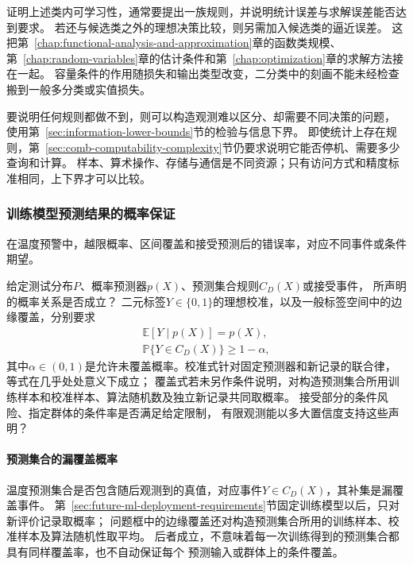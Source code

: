 证明上述类内可学习性，通常要提出一族规则，并说明统计误差与求解误差能否达到要求。
若还与候选类之外的理想决策比较，则另需加入候选类的逼近误差。
这把第~\ref{chap:functional-analysis-and-approximation}章的函数类规模、
第~\ref{chap:random-variables}章的估计条件和第~\ref{chap:optimization}章的求解方法接在一起。
容量条件的作用随损失和输出类型改变，二分类中的刻画不能未经检查搬到一般多分类或实值损失。

要说明任何规则都做不到，则可以构造观测难以区分、却需要不同决策的问题，
使用第~\ref{sec:information-lower-bounds}节的检验与信息下界。
即使统计上存在规则，第~\ref{sec:comb-computability-complexity}节仍要求说明它能否停机、需要多少查询和计算。
样本、算术操作、存储与通信是不同资源；只有访问方式和精度标准相同，上下界才可以比较。

\subsubsection{训练模型预测结果的概率保证}
\label{sec:future-analysis-reliability}

在温度预警中，越限概率、区间覆盖和接受预测后的错误率，对应不同事件或条件期望。

\begin{mathproblem}[预测与决策的概率关系是否满足要求]
  \label{question:future-reliability}
  给定测试分布$P$、概率预测器$p(X)$、预测集合规则$C_D(X)$或接受事件，
  所声明的概率关系是否成立？
  二元标签$Y\in\{0,1\}$的理想校准，以及一般标签空间中的边缘覆盖，分别要求
  \[
    \begin{gathered}
      \mathbb E[Y\mid p(X)]=p(X),\\
      \mathbb P\{Y\in C_D(X)\}\geq1-\alpha,
    \end{gathered}
  \]
  其中$\alpha\in(0,1)$是允许未覆盖概率。校准式针对固定预测器和新记录的联合律，等式在几乎处处意义下成立；
  覆盖式若未另作条件说明，对构造预测集合所用训练样本和校准样本、算法随机数及独立新记录共同取概率。
  接受部分的条件风险、指定群体的条件率是否满足给定限制，
  有限观测能以多大置信度支持这些声明？
\end{mathproblem}

\paragraph{预测集合的漏覆盖概率}

温度预测集合是否包含随后观测到的真值，对应事件$Y\in C_D(X)$，其补集是漏覆盖事件。
第~\ref{sec:future-ml-deployment-requirements}节固定训练模型以后，只对新评价记录取概率；
问题框中的边缘覆盖还对构造预测集合所用的训练样本、校准样本及算法随机性取平均。
后者成立，不意味着每一次训练得到的预测集合都具有同样覆盖率，也不自动保证每个
预测输入或群体上的条件覆盖。

